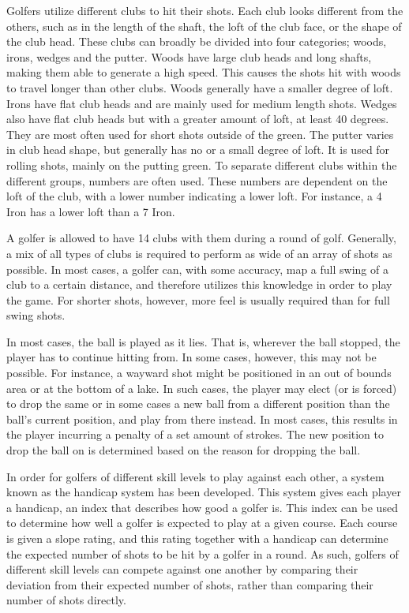\documentclass{kththesis}
\begin{document}
Golfers utilize different clubs to hit their shots. Each club looks different from the others, such as in the length of the shaft, the loft of the club face, or the shape of the club head. These clubs can broadly be divided into four categories; woods, irons, wedges and the putter. Woods have large club heads and long shafts, making them able to generate a high speed. This causes the shots hit with woods to travel longer than other clubs. Woods generally have a smaller degree of loft. Irons have flat club heads and are mainly used for medium length shots. Wedges also have flat club heads but with a greater amount of loft, at least 40 degrees. They are most often used for short shots outside of the green. The putter varies in club head shape, but generally has no or a small degree of loft. It is used for rolling shots, mainly on the putting green. To separate different clubs within the different groups, numbers are often used. These numbers are dependent on the loft of the club, with a lower number indicating a lower loft. For instance, a 4 Iron has a lower loft than a 7 Iron.

A golfer is allowed to have 14 clubs with them during a round of golf. Generally, a mix of all types of clubs is required to perform as wide of an array of shots as possible. In most cases, a golfer can, with some accuracy, map a full swing of a club to a certain distance, and therefore utilizes this knowledge in order to play the game. For shorter shots, however, more feel is usually required than for full swing shots.

In most cases, the ball is played as it lies. That is, wherever the ball stopped, the player has to continue hitting from. In some cases, however, this may not be possible. For instance, a wayward shot might be positioned in an out of bounds area or at the bottom of a lake. In such cases, the player may elect (or is forced) to drop the same or in some cases a new ball from a different position than the ball's current position, and play from there instead. In most cases, this results in the player incurring a penalty of a set amount of strokes. The new position to drop the ball on is determined based on the reason for dropping the ball. 

In order for golfers of different skill levels to play against each other, a system known as the handicap system has been developed. This system gives each player a handicap, an index that describes how good a golfer is. This index can be used to determine how well a golfer is expected to play at a given course. Each course is given a slope rating, and this rating together with a handicap can determine the expected number of shots to be hit by a golfer in a round. As such, golfers of different skill levels can compete against one another by comparing their deviation from their expected number of shots, rather than comparing their number of shots directly.
\end{document}
